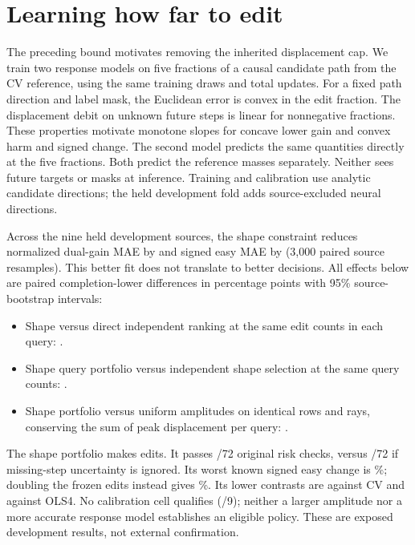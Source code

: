 \section{Learning how far to edit}
The preceding bound motivates removing the inherited displacement cap.
We train two response models on five fractions of a causal candidate path
from the CV reference, using the same training draws and
\AmplitudeStudyUpdates{} total updates. For a fixed path direction and
label mask, the Euclidean error is convex in the edit fraction.
The displacement debit on unknown future steps is linear for nonnegative
fractions. These properties motivate monotone slopes for concave lower
gain and convex harm and signed change. The second model predicts the
same quantities directly at the five fractions. Both predict the
reference masses separately. Neither sees future targets or masks at
inference. Training and calibration use analytic candidate directions;
the held development fold adds source-excluded neural directions.

Across the nine held development sources, the shape constraint reduces
normalized dual-gain MAE by \AmplitudeStudyGainError{} and signed easy
MAE by \AmplitudeStudySignedError{} (3,000 paired source resamples).
This better fit does not translate to better decisions. All effects below
are paired completion-lower differences in percentage points with 95\%
source-bootstrap intervals:
\begin{itemize}
  \item Shape versus direct independent ranking at the same edit
  counts in each query: \AmplitudeStudyCount{}.
  \item Shape query portfolio versus independent shape selection
  at the same query counts: \AmplitudeStudyPortfolio{}.
  \item Shape portfolio versus uniform amplitudes on identical rows
  and rays, conserving the sum of peak displacement per query:
  \AmplitudeStudyMass{}.
\end{itemize}
The shape portfolio makes \AmplitudeStudyEdits{} edits.
It passes \AmplitudeStudyRisk{}/72 original risk checks, versus
\AmplitudeStudyKnown{}/72 if missing-step uncertainty is ignored.
Its worst known signed easy change is \AmplitudeStudyWorst{}\%;
doubling the frozen edits instead gives \AmplitudeStudyBoostWorst{}\%.
Its lower contrasts are \AmplitudeStudyCV{} against CV and
\AmplitudeStudyOLS{} against OLS4. No calibration cell qualifies
(\AmplitudeStudyQual{}/9); neither a larger amplitude nor a more
accurate response model establishes an eligible policy.
These are exposed development results, not external confirmation.
